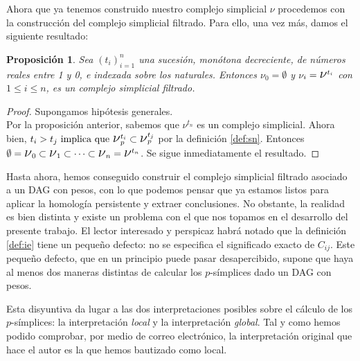 \documentclass[12pt, a4paper, twoside]{book}
\numberwithin{equation}{section}
\theoremstyle{definition}
\theoremstyle{remark}
\theoremstyle{plain}
\newtheorem{prop}{Proposición}
\begin{document}
	Ahora que ya tenemos construido nuestro complejo simplicial 
	{\Large $\nu$} procedemos con la construcción del complejo simplicial 
	filtrado. Para ello, una vez más, damos el siguiente resultado:

	\begin{prop}
		Sea $(t_{i})_{i=1}^{n}$ una sucesión, monótona decreciente, 
		de números reales entre 1 y 0, e indexada sobre los naturales. 
		Entonces {\Large $\nu$}$_{0}=\emptyset$ y {\Large $\nu$}$_{i}=
		\text{{\Large $\nu$}}^{t_{i}}$ con $1\leq i \leq n$, es un 
		complejo simplicial filtrado.   
	\end{prop}

	\begin{proof}
		Supongamos hipótesis generales.\\
		Por la proposición anterior, sabemos que 
		{\Large $\nu$}$^{t_{n}}$ es un complejo simplicial. Ahora 
		bien, $t_{i} > t_{j} \text{ implica que } 
		\text{{\Large $\nu$}}_{p}^{t_{i}} \subset 
		\text{{\Large $\nu$}}_{p}^{t_{j}}$ por la definición 
		\ref{def:sn}. Entonces $\emptyset=\text{{\Large $\nu$}}_{0} 
		\subset \text{{\Large $\nu$}}_{1} \subset \cdots \subset 
		\text{{\Large $\nu$}}_{n}=\text{{\Large $\nu$}}^{t_{n}}$. Se 
		sigue inmediatamente el resultado.
	\end{proof}

	Hasta ahora, hemos conseguido construir el complejo simplicial 
	filtrado asociado a un DAG con pesos, con lo que podemos pensar que ya 
	estamos listos para aplicar la homología persistente y extraer 
	conclusiones. No obstante, la realidad es bien distinta y existe un 
	problema con el que nos topamos en el desarrollo del presente trabajo. 
	El lector interesado y perspicaz habrá notado que la definición 
	\ref{def:ie} tiene un pequeño defecto: no se especifica el significado
	exacto de $C_{ij}$. Este pequeño defecto, que en un principio puede 
	pasar desapercibido, supone que haya al menos dos maneras distintas de 
	calcular los $p$-símplices dado un DAG con pesos.

	Esta disyuntiva da lugar a las dos interpretaciones posibles sobre el
	cálculo de los $p$-símplices: la interpretación \emph{local} y la 
	interpretación \emph{global}. Tal y como hemos podido comprobar, por 
	medio de correo electrónico, la interpretación original que hace el 
	autor es la que hemos bautizado como local.
	
\end{document}
